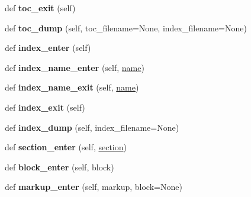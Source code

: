 \begin{DoxyCompactItemize}
def {\bfseries toc\+\_\+exit} (self)
\item 
\mbox{\label{classformatter_1_1_formatter_a820c4494f6716a7163130256ce226549}} 
def {\bfseries toc\+\_\+dump} (self, toc\+\_\+filename=None, index\+\_\+filename=None)
\item 
\mbox{\label{classformatter_1_1_formatter_a3a07309d0b6acf49a916f9bbee67a81c}} 
def {\bfseries index\+\_\+enter} (self)
\item 
\mbox{\label{classformatter_1_1_formatter_af0b5c15dc5c46f6a357bb13f1bc8745f}} 
def {\bfseries index\+\_\+name\+\_\+enter} (self, \hyperlink{structname}{name})
\item 
\mbox{\label{classformatter_1_1_formatter_aa3be4d32dd5a6e71b4860b38db7e3458}} 
def {\bfseries index\+\_\+name\+\_\+exit} (self, \hyperlink{structname}{name})
\item 
\mbox{\label{classformatter_1_1_formatter_a0a5667999796bdc84ba674f6cac58e37}} 
def {\bfseries index\+\_\+exit} (self)
\item 
\mbox{\label{classformatter_1_1_formatter_a34af2f45c8da0713dcbc05e00d0472fd}} 
def {\bfseries index\+\_\+dump} (self, index\+\_\+filename=None)
\item 
\mbox{\label{classformatter_1_1_formatter_a84024c1e9fd55aef8b637765a3802f6c}} 
def {\bfseries section\+\_\+enter} (self, \hyperlink{structsection}{section})
\item 
\mbox{\label{classformatter_1_1_formatter_aa1e93edcecc9d1da0223459bc7cb5062}} 
def {\bfseries block\+\_\+enter} (self, block)
\item 
\mbox{\label{classformatter_1_1_formatter_a02f0dc2981394305c7d9f1451d585321}} 
def {\bfseries markup\+\_\+enter} (self, markup, block=None)
\item 
\mbox{\label{classformatter_1_1_formatter_a05aa3c61a5a05539e60efe8fd77bb6e6}} 

\end{DoxyCompactItemize}
